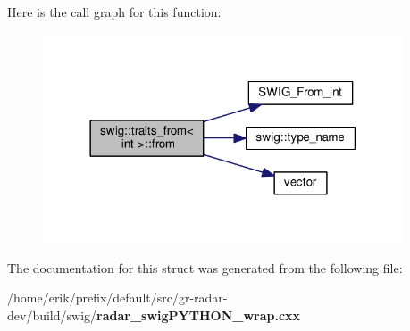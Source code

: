 Here is the call graph for this function\+:
\nopagebreak
\begin{figure}[H]
\begin{center}
\leavevmode
\includegraphics[width=302pt]{d2/dcf/structswig_1_1traits__from_3_01int_01_4_a4db26c74c33211bc2edbb0a65061a96f_cgraph}
\end{center}
\end{figure}




The documentation for this struct was generated from the following file\+:\begin{DoxyCompactItemize}
\item 
/home/erik/prefix/default/src/gr-\/radar-\/dev/build/swig/{\bf radar\+\_\+swig\+P\+Y\+T\+H\+O\+N\+\_\+wrap.\+cxx}\end{DoxyCompactItemize}
